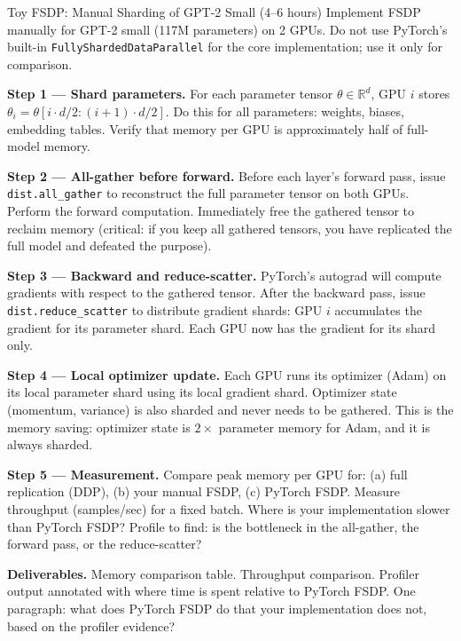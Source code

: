 \begin{exercise}{Toy FSDP: Manual Sharding of GPT-2 Small (4--6 hours)}
Implement FSDP manually for GPT-2 small (117M parameters) on 2 GPUs.
Do not use PyTorch's built-in \texttt{FullyShardedDataParallel} for the core implementation;
use it only for comparison.

\medskip
\textbf{Step 1 --- Shard parameters.}
For each parameter tensor $\theta \in \mathbb{R}^{d}$, GPU $i$ stores
$\theta_i = \theta[i \cdot d/2 : (i+1) \cdot d/2]$.
Do this for all parameters: weights, biases, embedding tables.
Verify that memory per GPU is approximately half of full-model memory.

\medskip
\textbf{Step 2 --- All-gather before forward.}
Before each layer's forward pass, issue \texttt{dist.all\_gather} to reconstruct the full parameter
tensor on both GPUs.
Perform the forward computation.
Immediately free the gathered tensor to reclaim memory (critical: if you keep all gathered tensors,
you have replicated the full model and defeated the purpose).

\medskip
\textbf{Step 3 --- Backward and reduce-scatter.}
PyTorch's autograd will compute gradients with respect to the gathered tensor.
After the backward pass, issue \texttt{dist.reduce\_scatter} to distribute gradient shards:
GPU $i$ accumulates the gradient for its parameter shard.
Each GPU now has the gradient for its shard only.

\medskip
\textbf{Step 4 --- Local optimizer update.}
Each GPU runs its optimizer (Adam) on its local parameter shard using its local gradient shard.
Optimizer state (momentum, variance) is also sharded and never needs to be gathered.
This is the memory saving: optimizer state is $2\times$ parameter memory for Adam,
and it is always sharded.

\medskip
\textbf{Step 5 --- Measurement.}
Compare peak memory per GPU for: (a) full replication (DDP), (b) your manual FSDP,
(c) PyTorch FSDP.
Measure throughput (samples/sec) for a fixed batch.
Where is your implementation slower than PyTorch FSDP?
Profile to find: is the bottleneck in the all-gather, the forward pass, or the reduce-scatter?

\medskip
\textbf{Deliverables.}
Memory comparison table.
Throughput comparison.
Profiler output annotated with where time is spent relative to PyTorch FSDP.
One paragraph: what does PyTorch FSDP do that your implementation does not, based on the profiler evidence?
\end{exercise}

